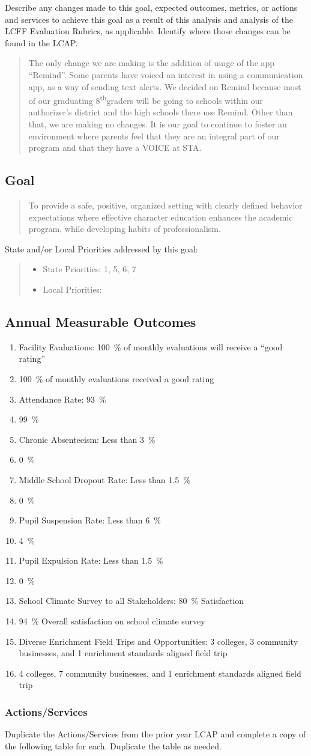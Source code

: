 \documentclass{article}
\makeatletter
\renewcommand{\th}{\textsuperscript{th}}
\newcounter{goal}[section]
\newcommand{\Goal}[3]{
	\refstepcounter{goal}
	\subsection{Goal \arabic{goal}}
	\begin{quote}
		#1
	\end{quote}
	State and/or Local Priorities addressed by this goal:
	\begin{quote}
		\begin{itemize}[label={}]
		\item State Priorities: #2
		\item Local Priorities: #3
		\end{itemize}
	\end{quote}
}
\newcommand*{\expact}[1]{%
	\expandafter\@expact\csname c@#1\endcsname%
}
\newcommand*{\@expact}[1]{%
	$\ifcase\intcalcSub{2}{\intcalcMod{#1}{2}}\or{\text{Expected:}}\or{\text{Actual:}}
    \else\@ctrerr\fi$
}
\newcommand{\outcomepair}[2]{
	\item #1
	\item #2
	\bigskip
}
\newenvironment{outcomes}
	{
		\subsection{Annual Measurable Outcomes}
		\begin{enumerate}[label=\expact*]
		\setlength{\itemsep}{0pt}
	}
	{\end{enumerate}}
\newcounter{action}[goal]
\makeatother
\begin{document}
Describe any changes made to this goal, expected outcomes, metrics, or actions and services to achieve this goal as a result of this analysis and analysis of the LCFF Evaluation Rubrics, as applicable. Identify where those changes can be found in the LCAP.
\begin{quote}
	The only change we are making is the addition of usage of the app ``Remind''. Some parents have voiced an interest in using a communication app, as a way of sending text alerts. We decided on Remind because most of our graduating 8\th graders will be going to schools within our authorizer's district and the high schools there use Remind. Other than that, we are making no changes. It is our goal to continue to foster an environment where parents feel that they are an integral part of our program and that they have a VOICE at STA.
\end{quote}

\Goal
	{To provide a safe, positive, organized setting with clearly defined behavior expectations where effective character education enhances the academic program, while developing habits of professionalism.}
	{1, 5, 6, 7}
	{}

\begin{outcomes}
	\outcomepair
	{Facility Evaluations: \SI{100}{\percent} of monthly evaluations will receive a ``good rating''}
	{\SI{100}{\percent} of monthly evaluations received a good rating}
	\outcomepair
	{Attendance Rate: \SI{93}{\percent}}
	{\SI{99}{\percent}}
	\outcomepair
	{Chronic Absenteeism: Less than \SI{3}{\percent}}
	{\SI{0}{\percent}}
	\outcomepair
	{Middle School Dropout Rate: Less than \SI{1.5}{\percent}}
	{\SI{0}{\percent}}
	\outcomepair
	{Pupil Suspension Rate: Less than \SI{6}{\percent}}
	{\SI{4}{\percent}}
	\outcomepair
	{Pupil Expulsion Rate: Less than \SI{1.5}{\percent}}
	{\SI{0}{\percent}}
	\outcomepair
	{School Climate Survey to all Stakeholders: \SI{80}{\percent} Satisfaction}
	{\SI{94}{\percent} Overall satisfaction on school climate survey}
	\outcomepair
	{Diverse Enrichment Field Trips and Opportunities: 3 colleges, 3 community businesses, and 1 enrichment standards aligned field trip}
	{4 colleges, 7 community businesses, and 1 enrichment standards aligned field trip}
\end{outcomes}

\subsubsection{Actions/Services}
Duplicate the Actions/Services from the prior year LCAP and complete a copy of the following table for each. Duplicate the table as needed.
\end{document}

